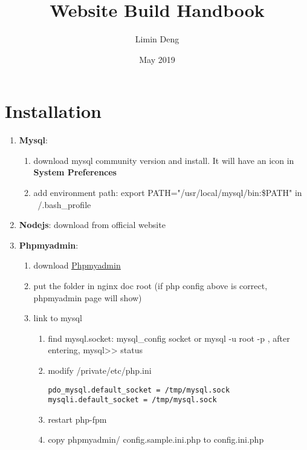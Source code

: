 \documentclass[12pt, a4paper]{report}
\title{\textbf{Website Build Handbook}}
\author{Limin Deng}
\date{May 2019}
\begin{document}
\maketitle

\tableofcontents{}
\clearpage


\section{Installation}
\begin{enumerate}
    \item \textbf{Mysql}: 
        \begin{enumerate}
            \item download mysql community version and install. It will have an icon in \textbf{System Preferences}
            \item add environment path: \colorbox{gray!30}{export PATH="/usr/local/mysql/bin:\$PATH"} in ~/.bash\_profile
        \end{enumerate}
    \item \textbf{Nodejs}: download from official website
    \item \textbf{Phpmyadmin}: 
        \begin{enumerate}
            \item download \underline{\href{https://www.phpmyadmin.net}{Phpmyadmin}}
            \item put the folder in nginx doc root (if php config above is correct, phpmyadmin page will show)
            \item link to mysql
                \begin{enumerate}
                    \item find mysql.socket: \colorbox{gray!30}{mysql\_config \-\-socket} or \colorbox{gray!30}{mysql -u root -p }, after entering, \colorbox{gray!30}{mysql>> status}
                    \item modify \colorbox{gray!30}{/private/etc/php.ini}
                    \begin{lstlisting}
pdo_mysql.default_socket = /tmp/mysql.sock
mysqli.default_socket = /tmp/mysql.sock
                    \end{lstlisting}
                    \item restart php-fpm
                    
                    \item copy \colorbox{gray!30}{phpmyadmin/ config.sample.ini.php} to \colorbox{gray!30}{config.ini.php}
                    

\end{enumerate}
\end{enumerate}
\end{enumerate}
\end{document}
